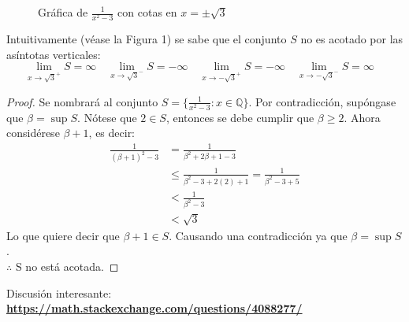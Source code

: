 \documentclass[a4paper,12pt]{article}
\begin{document}
\begin{figure}[htbp]
  \centering
  
  \caption{Gráfica de $\frac{1}{x^2-3}$ con cotas en $x=\pm\sqrt{3}$}
\end{figure}
Intuitivamente (véase la Figura 1) se sabe que el conjunto $S$ no es acotado por las asíntotas verticales: 
$$\lim_{x\to \sqrt{3}^+} S=\infty \quad \lim_{x\to \sqrt{3}^-} S=-\infty \quad\lim_{x\to -\sqrt{3}^+} S=-\infty \quad\lim_{x\to -\sqrt{3}^-} S=\infty \quad$$
\begin{proof}
Se nombrará al conjunto $S=\{\frac{1}{x^2-3}:x\in\mathbb{Q}\}$. Por contradicción, supóngase que $\beta =\sup S$. Nótese que $2\in S$, entonces se debe cumplir que $\beta \geq 2$. Ahora considérese $\beta+1$, es decir: 
\begin{align}
     \frac{1}{(\beta+1)^2-3} &= \frac{1}{\beta^2+2\beta+1-3}\\ &\leq\frac{1}{\beta^2-3+2(2)+1} =\frac{1}{\beta^2-3+5}\\
     &<\frac{1}{\beta^2-3}\\
     &<\sqrt{3}
\end{align}
Lo que quiere decir que $\beta+1\in S$. Causando una contradicción ya que $\beta=\sup S$.\\ $\therefore$ S no está acotada. 
\end{proof}
Discusión interesante: \textbf{\href{https://math.stackexchange.com/questions/4088277/the-set-frac1x2-3-x-in-mathbbq-is-bounded-explain}{https://math.stackexchange.com/questions/4088277/}}
\end{document}
